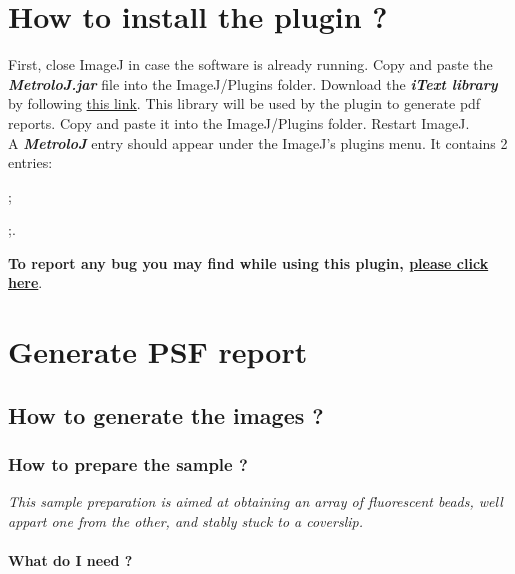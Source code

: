 \documentclass[a4paper, 11pt]{report}%
\makeatletter
\newcommand{\mailbug}{\begin{center}\textbf{To report any bug you may find while using this plugin, \href{mailto:fabrice.cordelieres@gmail.com,cedric.matthews@ibdml.univ-mrs.fr ?subject=Bug\%20found\%20in\%20MetroloJ&body=\%0ABug\%20description:\%0A\%0AHow\%20did\%20it\%20happen:\%0A\%0ACopy/Paste\%20the\%20content\%20of\%20the\%20log\%20window\%0A\%0AVersion\%20of\%20ImageJ:\%0A\%0AVersion\%20of\%20Java:}{please click here}}.\end{center}}
\makeatother
\begin{document}
\chapter{How to install the plugin ?}

First, close ImageJ in case the software is already running. Copy and paste the \textit{\textbf{MetroloJ.jar}} file into the ImageJ/Plugins folder. Download the \textit{\textbf{iText library}} by following \href{http://prdownloads.sourceforge.net/itext/iText-2.1.5.jar}{this link}. This library will be used by the plugin to generate pdf reports. Copy and paste it into the ImageJ/Plugins folder. Restart ImageJ.\\
A \textit{\textbf{MetroloJ}} entry should appear under the ImageJ's plugins menu. It contains 2 entries:

\begin{itemize*} %
	\item {};
	\item {};.
\end{itemize*}

\mailbug

\chapter{Generate PSF report}
\label{chap:grp}

\section{How to generate the images ?}
\label{sec:gpr-what}

\subsection{How to prepare the sample ?}
\label{sec:gpr-proto}

\textit{This sample preparation is aimed at obtaining an array of fluorescent beads, well appart one from the other, and stably stuck to a coverslip.}

\subsubsection{What do I need ?}
\label{sec:gpr-proto-what}
\end{document}

